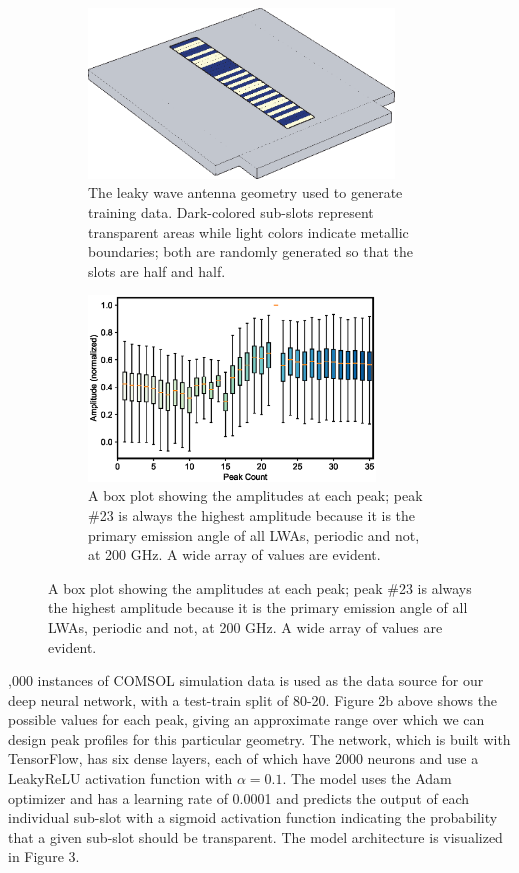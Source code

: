 \documentclass[11pt]{article}
\begin{document}
\begin{figure}[H]
	\caption{Simulation geometry (left) and possible peak profiles (right)}
	\begin{subfigure}[b]{0.45\textwidth}
		\centering
		\includegraphics[width = 3.2in]{figures/fig5.eps}
		\caption{The leaky wave antenna geometry used to generate training data. Dark-colored sub-slots represent transparent areas while light colors indicate metallic boundaries; both are randomly generated so that the slots are half and half.}
	\end{subfigure}
	\begin{subfigure}[b]{0.55\textwidth}
		\centering
		\includegraphics[width=3in]{figures/fig2new.eps}

		\caption{A box plot showing the amplitudes at each peak; peak \#23 is always the highest amplitude because it is the primary emission angle of all LWAs, periodic and not, at 200 GHz. A wide array of values are evident.}
	\end{subfigure}

\end{figure}


,000 instances of COMSOL simulation data is used as the data source for our deep neural network, with a test-train split of 80-20. Figure 2b above shows the possible values for each peak, giving an approximate range over which we can design peak profiles for this particular geometry. The network, which is built with TensorFlow, has six dense layers, each of which have 2000 neurons and use a LeakyReLU activation function with $\alpha = 0.1$. The model uses the Adam optimizer and has a learning rate of 0.0001 and predicts the output of each individual sub-slot with a sigmoid activation function indicating the probability that a given sub-slot should be transparent. The model architecture is visualized in Figure 3. \\
\end{document}
